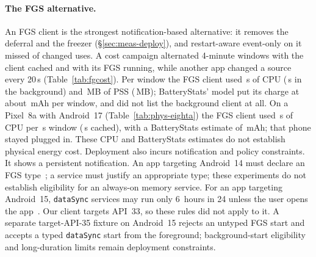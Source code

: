 \paragraph{The FGS alternative.} An FGS client is the strongest notification-based alternative: it removes the deferral and the freezer (\S\ref{sec:meas-deploy}), and restart-aware event-only on it missed \FgAnyEvrK of \FgAnyChanged changed uses. A cost campaign alternated 4-minute windows with the client cached and with its FGS running, while another app changed a source every 20\,s (Table~\ref{tab:fgcost}). Per window the FGS client used \CostFgCpu\,s of CPU (\CostBgCpu\,s in the background) and \CostFgPss\,MB of PSS (\CostBgPss\,MB); BatteryStats' model put its charge at about \CostFgPower\,mAh per window, and did not list the background client at all. On a Pixel~8a with Android~17 (Table~\ref{tab:phys-eighta}) the FGS client used \PhysEightAFgCpu\,s of CPU per \PhysEightAFgWindowS\,s window (\PhysEightABgCpu\,s cached), with a BatteryStats estimate of \PhysEightAFgPower\,mAh; that phone stayed plugged in. These CPU and BatteryStats estimates do not establish physical energy cost. Deployment also incurs notification and policy constraints. It shows a persistent notification. An app targeting Android~14 must declare an FGS type~\cite{android_fgstypes}; a service must justify an appropriate type; these experiments do not establish eligibility for an always-on memory service. For an app targeting Android~15, \texttt{dataSync} services may run only 6~hours in 24 unless the user opens the app~\cite{android_fgstimeout}. Our client targets API~33, so these rules did not apply to it. A separate target-API-35 fixture on Android~15 rejects an untyped FGS start and accepts a typed \texttt{dataSync} start from the foreground; background-start eligibility and long-duration limits remain deployment constraints.





